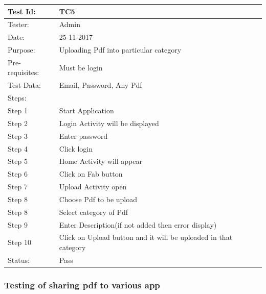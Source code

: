  \begin{center}
\begin{tabular}{ | m{5em} | m{5cm}|} 
\hline
Test Id: & TC5   \\ 
\hline
Tester: & Admin  \\ 
\hline
Date: & 25-11-2017  \\ 
\hline
Purpose: & Uploading Pdf into particular category   \\ 
\hline
Pre-requisites: & Must be login   \\ 
\hline
Test Data: & Email, Password, Any Pdf   \\ 
\hline
Steps: &  \\
\hline  
Step 1 &  Start Application \\ 
Step 2 &  Login Activity will be displayed  \\ 
Step 3 &  Enter password  \\ 
Step 4 &  Click login  \\ 
Step 5 &  Home Activity will appear  \\ 
Step 6 &  Click on Fab button \\
Step 7 &  Upload Activity open \\
Step 8 &  Choose Pdf to be upload \\
Step 8 &  Select category of Pdf \\
Step 9 &  Enter Description(if not added then error display) \\
Step 10 &  Click on Upload button and it will be uploaded in that category \\
\hline
Status: & Pass   \\ 
\hline
\end{tabular}
\end{center}

\subsubsection{Testing of sharing pdf to various app} 	

